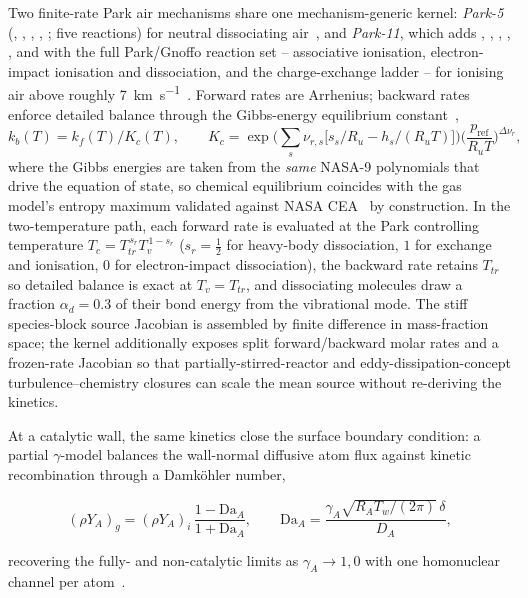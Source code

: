 \documentclass[journal,biblatex]{new-aiaa}
\newcommand{\half}{\tfrac12}
\begin{document}
Two finite-rate Park air mechanisms share one mechanism-generic kernel: \emph{Park-5} (, , , , ; five reactions) for neutral dissociating air~\cite{park_nonequilibrium_1989}, and \emph{Park-11}, which adds , , , , , and  with the full Park/Gnoffo reaction set -- associative ionisation, electron-impact ionisation and dissociation, and the charge-exchange ladder -- for ionising air above roughly \qty{7}{\km\per\s}~\cite{park_review_1993,park_assessment_1989,gnoffo_conservation_1989}. Forward rates are Arrhenius; backward rates enforce detailed balance through the Gibbs-energy equilibrium constant~\cite{mcbride_computer_1996},
\begin{equation}
k_b(T)=k_f(T)/K_c(T),\qquad
K_c=\exp\!\Big(\sum_s\nu_{r,s}\big[s_s/R_u - h_s/(R_u T)\big]\Big)\Big(\frac{p_{\mathrm{ref}}}{R_u T}\Big)^{\Delta\nu_r},
\end{equation}
where the Gibbs energies are taken from the \emph{same} NASA-9 polynomials that drive the equation of state, so chemical equilibrium coincides with the gas model's entropy maximum validated against NASA CEA~\cite{noauthor_nasacea_2026} by construction. In the two-temperature path, each forward rate is evaluated at the Park controlling temperature $T_c=T_{tr}^{\,s_r}T_v^{\,1-s_r}$ ($s_r=\half$ for heavy-body dissociation, $1$ for exchange and ionisation, $0$ for electron-impact dissociation), the backward rate retains $T_{tr}$ so detailed balance is exact at $T_v=T_{tr}$, and dissociating molecules draw a fraction $\alpha_d=0.3$ of their bond energy from the vibrational mode. The stiff species-block source Jacobian is assembled by finite difference in mass-fraction space; the kernel additionally exposes split forward/backward molar rates and a frozen-rate Jacobian so that partially-stirred-reactor and eddy-dissipation-concept turbulence--chemistry closures can scale the mean source without re-deriving the kinetics.

At a catalytic wall, the same kinetics close the surface boundary condition: a partial $\gamma$-model balances the wall-normal diffusive atom flux against kinetic recombination through a Damk\"ohler number,

\begin{equation}
(\rho Y_A)_g=(\rho Y_A)_i\,\frac{1-\mathrm{Da}_A}{1+\mathrm{Da}_A},
\qquad \mathrm{Da}_A=\frac{\gamma_A\sqrt{R_A T_w/(2\pi)}\,\delta}{D_A},
\end{equation}

recovering the fully- and non-catalytic limits as $\gamma_A\to1,0$ with one homonuclear channel per atom~\cite{wright_data_2009}.
\end{document}
